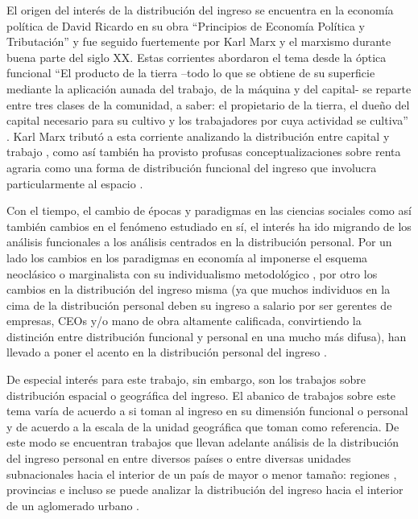 El origen del interés de la distribución del ingreso se encuentra en la economía política de David Ricardo \citeyear{ricardo} en su obra “Principios de Economía Política y Tributación” y fue seguido fuertemente por Karl Marx y el marxismo durante buena parte del siglo XX. Estas corrientes abordaron el tema desde la óptica funcional “El producto de la tierra –todo lo que se obtiene de su superficie mediante la aplicación aunada del trabajo, de la máquina y del capital- se reparte entre tres clases de la comunidad, a saber: el propietario de la tierra, el dueño del capital necesario para su cultivo y los trabajadores por cuya actividad se cultiva” \cite[~5]{ricardo}. Karl Marx tributó a esta corriente analizando la distribución entre capital y trabajo \cite{marx2004}, como así también ha provisto profusas conceptualizaciones sobre renta agraria como una forma de distribución funcional del ingreso que involucra particularmente al espacio \cite{marx2011}. 

Con el tiempo, el cambio de épocas y paradigmas en las ciencias sociales como así también cambios en el fenómeno estudiado en sí, el interés ha ido migrando de los análisis funcionales a los análisis centrados en la distribución personal. Por un lado los cambios en los paradigmas en economía al imponerse el esquema neoclásico o marginalista con su individualismo metodológico \cite{blaug}, por otro los cambios en la distribución del ingreso misma (ya que muchos individuos en la cima de la distribución personal deben su ingreso a salario por ser gerentes de empresas, CEOs y/o mano de obra altamente calificada, convirtiendo la distinción entre distribución funcional y personal en una mucho más difusa), han llevado a poner el acento en la distribución personal del ingreso \cite{altimir1986,gasparini2001}.

De especial interés para este trabajo, sin embargo, son los trabajos sobre distribución espacial o geográfica del ingreso. El abanico de trabajos sobre este tema varía de acuerdo a si toman al ingreso en su dimensión funcional o personal y de acuerdo a la escala de la unidad geográfica que toman como referencia. De este modo se encuentran trabajos que llevan adelante análisis de la distribución del ingreso personal en entre diversos países \cite{theil,milanovic2002,milanovic2005,davies} o entre diversas unidades subnacionales hacia el interior de un país de mayor o menor tamaño: regiones \cite{orsatti,artana}, provincias \cite{altimir1975} e incluso se puede analizar la distribución del ingreso hacia el interior de un aglomerado urbano \cite{gasparini2000,giayetto} . 

